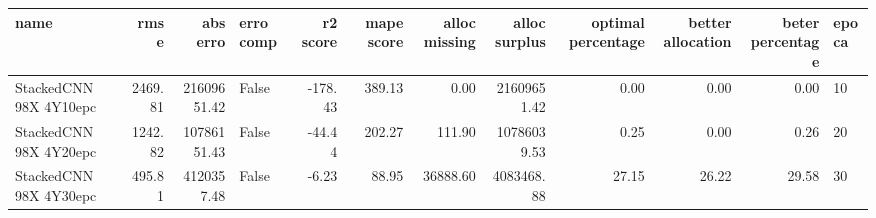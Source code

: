 \begin{tabular}{lrrlrrrrrrrl}
\toprule
name & rmse & abs erro & erro comp & r2 score & mape score & alloc missing & alloc surplus & optimal percentage & better allocation & beter percentage & epoca \\
\midrule
StackedCNN 98X 4Y10epc & 2469.81 & 21609651.42 & False & -178.43 & 389.13 & 0.00 & 21609651.42 & 0.00 & 0.00 & 0.00 & 10 \\
StackedCNN 98X 4Y20epc & 1242.82 & 10786151.43 & False & -44.44 & 202.27 & 111.90 & 10786039.53 & 0.25 & 0.00 & 0.26 & 20 \\
StackedCNN 98X 4Y30epc & 495.81 & 4120357.48 & False & -6.23 & 88.95 & 36888.60 & 4083468.88 & 27.15 & 26.22 & 29.58 & 30 \\
\bottomrule
\end{tabular}
